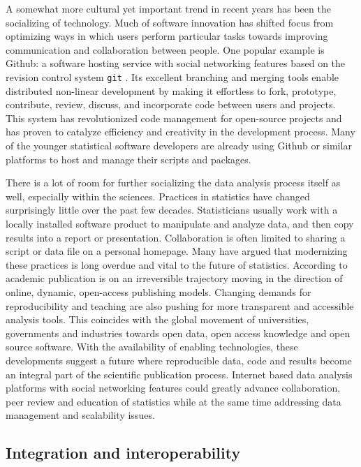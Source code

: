 A somewhat more cultural yet important trend in recent years has been the socializing of technology. Much of software innovation has shifted focus from optimizing ways in which users perform particular tasks towards improving communication and collaboration between people. One popular example is Github: a software hosting service with social networking features based on the revision control system \texttt{git} \citep{torvalds2010git}. Its excellent branching and merging tools enable distributed non-linear development by making it effortless to fork, prototype, contribute, review, discuss, and incorporate code between users and projects. This system has revolutionized code management for open-source projects and has proven to catalyze efficiency and creativity in the  development process. Many of the younger statistical software developers are already using Github or similar platforms to host and manage their scripts and packages. 

There is a lot of room for further socializing the data analysis process itself as well, especially within the sciences. Practices in statistics have changed surprisingly little over the past few decades. Statisticians usually work with a locally installed software product to manipulate and analyze data, and then copy results into a report or presentation. Collaboration is often limited to sharing a script or data file on a personal homepage. Many have argued that modernizing these practices is long overdue and vital to the future of statistics. According to \cite{future2013} academic publication is on an irreversible trajectory moving in the direction of online, dynamic, open-access publishing models. Changing demands for reproducibility \citep{peng2011reproducible} and teaching \citep{nolan2010computing} are also pushing for more transparent and accessible analysis tools. This coincides with the global movement of universities, governments and industries towards open data, open access knowledge and open source software. With the availability of enabling technologies, these developments suggest a future where reproducible data, code and results become an integral part of the scientific publication process. Internet based data analysis platforms with social networking features could greatly advance collaboration, peer review and education of statistics while at the same time addressing data management and scalability issues.



\subsection{Integration and interoperability}

